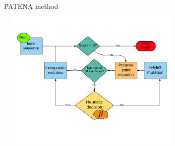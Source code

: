 \documentclass{beamer}
\begin{document}
\begin{frame}[plain]{PATENA method}
\begin{adjustwidth}{-2.0em}{-2.0em}
\includegraphics[width=350px,height=250px]{../img/patenaReduced-Beta.png} 
\end{adjustwidth}
\end{frame}























% 
%

\end{document}
